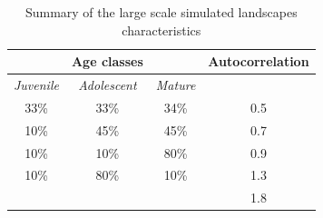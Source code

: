 \begin{table}[H]
\centering
\begin{tabular}{|ccc||c|}
\hline
 & Age classes &  & Autocorrelation \\
\hline
\textit{Juvenile}& \textit{Adolescent}& \textit{Mature}& \\
\hline
33\% & 33\% & 34\% & 0.5 \\
10\% & 45\% & 45\% & 0.7 \\
10\% & 10\% & 80\% & 0.9 \\
10\% & 80\% & 10\% & 1.3 \\
& & & 1.8\\
\hline
\end{tabular}
\caption{Summary of the large scale simulated landscapes characteristics}
\label{tab:composition_nlm}
\end{table}
\clearpage

